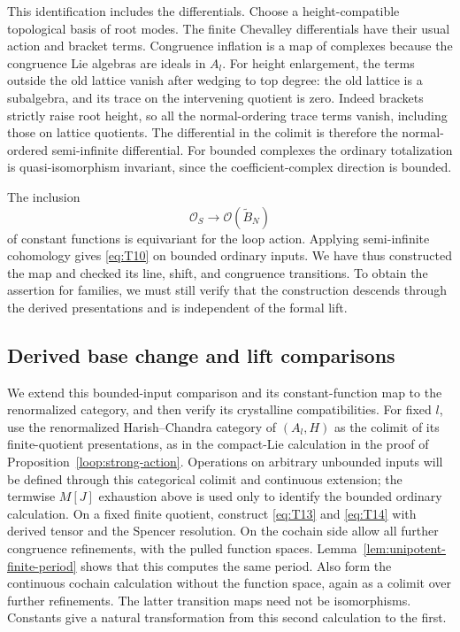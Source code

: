 \documentclass[11pt]{article}
\numberwithin{equation}{section}
\theoremstyle{definition}
\theoremstyle{remark}
\begin{document}
This identification includes the differentials.  Choose a
height-compatible topological basis of root modes.  The finite
Chevalley differentials have their usual action and bracket terms.
Congruence inflation is a map of complexes because the congruence
Lie algebras are ideals in $A_l$.  For height enlargement, the terms
outside the old lattice vanish after wedging to top degree: the
old lattice is a subalgebra, and its trace on the intervening quotient
is zero.  Indeed brackets strictly raise root height, so all the
normal-ordering trace terms vanish, including those on lattice
quotients.  The differential in the colimit is therefore the
normal-ordered semi-infinite differential.  For bounded complexes
the ordinary totalization is quasi-isomorphism invariant, since the
coefficient-complex direction is bounded.

The inclusion
\[
 \mathcal O_S\longrightarrow\mathcal O(\widetilde B_N)
\]
of constant functions is equivariant for the loop action.  Applying
semi-infinite cohomology gives \eqref{eq:T10} on bounded ordinary
inputs.  We have thus constructed the map and checked its line,
shift, and congruence transitions.  To obtain the assertion for
families, we must still verify that the construction descends through
the derived presentations and is independent of the formal lift.

\subsection{Derived base change and lift comparisons}

We extend this bounded-input comparison and its constant-function
map to the renormalized category, and then verify its crystalline
compatibilities.
For fixed $l$, use the renormalized Harish--Chandra category of
$(A_l,H)$ as the colimit of its finite-quotient presentations, as in
the compact-Lie calculation in the proof of
Proposition~\ref{loop:strong-action}.  Operations on arbitrary
unbounded inputs will be defined through this categorical colimit
and continuous extension; the termwise $M[J]$ exhaustion above is
used only to identify the bounded ordinary calculation.
On a fixed finite
quotient, construct \eqref{eq:T13} and \eqref{eq:T14} with derived
tensor and the Spencer resolution.  On the cochain side allow all
further congruence refinements, with the pulled function spaces.
Lemma~\ref{lem:unipotent-finite-period} shows that this computes the
same period.  Also form the continuous cochain calculation without
the function space, again as a colimit over further refinements.
The latter transition maps need not be isomorphisms.  Constants give
a natural transformation from this second calculation to the first.
\end{document}
